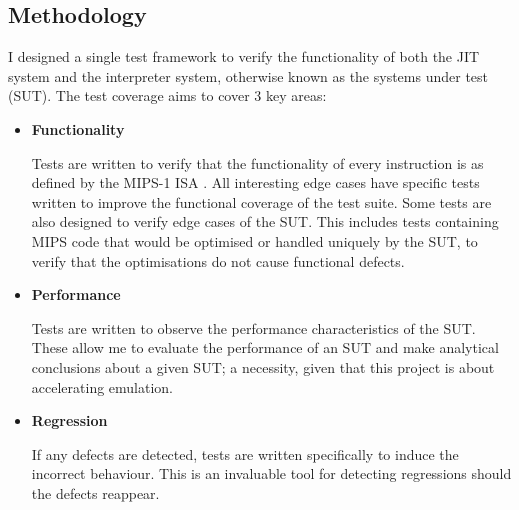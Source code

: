 \subsection{Methodology}

I designed a single test framework to verify the functionality of both the JIT system and the interpreter system, otherwise known as the systems under test (SUT). The test coverage aims to cover 3 key areas:

\begin{itemize}
    \item \textbf{Functionality}
    
    Tests are written to verify that the functionality of every instruction is as defined by the MIPS-1 ISA \cite{mips-1-isa}. All interesting edge cases have specific tests written to improve the functional coverage of the test suite. Some tests are also designed to verify edge cases of the SUT. This includes tests containing MIPS code that would be optimised or handled uniquely by the SUT, to verify that the optimisations do not cause functional defects.
    
    \item \textbf{Performance}
    
    Tests are written to observe the performance characteristics of the SUT. These allow me to evaluate the performance of an SUT and make analytical conclusions about a given SUT; a necessity, given that this project is about accelerating emulation.
    
    \item \textbf{Regression}
    
    If any defects are detected, tests are written specifically to induce the incorrect behaviour. This is an invaluable tool for detecting regressions should the defects reappear.
\end{itemize}
